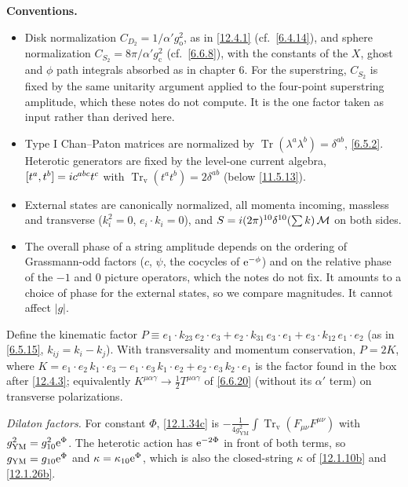 \begin{tcolorbox}[breakable]
	\begin{remark}
		\textbf{Conventions.}
		\begin{itemize}
			\item[(i)] Disk normalization $C_{D_{2}}=1/\alpha'g_{\mathrm o}^{2}$, as in \eqref{12.4.1} (cf.\ \eqref{6.4.14}), and sphere normalization $C_{S_{2}}=8\pi/\alpha'g_{\mathrm c}^{2}$ (cf.\ \eqref{6.6.8}), with the constants of the $X$, ghost and $\phi$ path integrals absorbed as in chapter 6. For the superstring, $C_{S_{2}}$ is fixed by the same unitarity argument applied to the four-point superstring amplitude, which these notes do not compute. It is the one factor taken as input rather than derived here.
			\item[(ii)] Type I Chan--Paton matrices are normalized by $\operatorname{Tr}(\lambda^{a}\lambda^{b})=\delta^{ab}$, \eqref{6.5.2}. Heterotic generators are fixed by the level-one current algebra, $[t^{a},t^{b}]=i c^{abc}t^{c}$ with $\operatorname{Tr}_{\mathrm v}(t^{a}t^{b})=2\delta^{ab}$ (below \eqref{11.5.13}).
			\item[(iii)] External states are canonically normalized, all momenta incoming, massless and transverse ($k_{i}^{2}=0$, $e_{i}\cdot k_{i}=0$), and $S=i(2\pi)^{10}\delta^{10}(\sum k)\,\mathcal M$ on both sides.
			\item[(iv)] The overall phase of a string amplitude depends on the ordering of Grassmann-odd factors ($c$, $\psi$, the cocycles of $\mathrm{e}^{-\phi}$) and on the relative phase of the $-1$ and $0$ picture operators, which the notes do not fix. It amounts to a choice of phase for the external states, so we compare magnitudes. It cannot affect $\lvert g\rvert$.
		\end{itemize}
		Define the kinematic factor $P\equiv e_{1}\!\cdot k_{23}\,e_{2}\!\cdot e_{3}+e_{2}\!\cdot k_{31}\,e_{3}\!\cdot e_{1}+e_{3}\!\cdot k_{12}\,e_{1}\!\cdot e_{2}$ (as in \eqref{6.5.15}, $k_{ij}=k_{i}-k_{j}$). With transversality and momentum conservation, $P=2K$, where $K=e_{1}\!\cdot e_{2}\,k_{1}\!\cdot e_{3}-e_{1}\!\cdot e_{3}\,k_{1}\!\cdot e_{2}+e_{2}\!\cdot e_{3}\,k_{2}\!\cdot e_{1}$ is the factor found in the box after \eqref{12.4.3}; equivalently $K^{\mu\alpha\gamma}\to\frac12T^{\mu\alpha\gamma}$ of \eqref{6.6.20} (without its $\alpha'$ term) on transverse polarizations.

		\emph{Dilaton factors.} For constant $\Phi$, \eqref{12.1.34c} is $-\frac{1}{4g^{2}_{\mathrm{YM}}}\int\operatorname{Tr}_{\mathrm v}(F_{\mu\nu}F^{\mu\nu})$ with $g^{2}_{\mathrm{YM}}=g^{2}_{10}\mathrm{e}^{\Phi}$. The heterotic action has $\mathrm{e}^{-2\Phi}$ in front of both terms, so $g_{\mathrm{YM}}=g_{10}\mathrm{e}^{\Phi}$ and $\kappa=\kappa_{10}\mathrm{e}^{\Phi}$, which is also the closed-string $\kappa$ of \eqref{12.1.10b} and \eqref{12.1.26b}.


\end{remark}
\end{tcolorbox}
